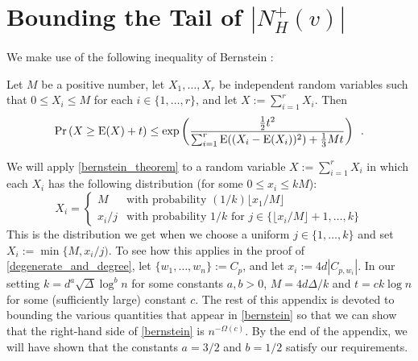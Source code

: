 \documentclass{patmorin}
\begin{document}



\appendix

\section{Bounding the Tail of \boldmath$|N_H^+(v)|$}

We make use of the following inequality of Bernstein \cite[Corollary~2.11]{boucheron.lugosi.ea:concentration}:

\begin{thm}\label{bernstein_theorem}
  Let $M$ be a positive number, let $X_1,\ldots,X_r$ be independent random variables such that $0\le X_i\le M$ for each $i\in\{1,\ldots,r\}$, and let $X:=\sum_{i=1}^r X_i$. Then
  \begin{equation}
    \Pr\left(X \ge \mathrm{E}(X)+ t\right)
      \le \exp\left(\frac{\tfrac{1}{2}t^2}{\sum_{i=1}^r \mathrm{E}((X_i-\mathrm{E}(X_i))^2)+\tfrac{1}{3}Mt}\right) \enspace . \label{bernstein}
  \end{equation}
\end{thm}
We will apply \cref{bernstein_theorem} to a random variable $X:=\sum_{i=1}^r X_i$ in which each $X_i$ has the following distribution (for some $0\le x_i\le kM$):
\[
  X_i = \begin{cases}
          M & \text{with probability $(1/k)\lfloor x_1/M\rfloor$} \\
          x_i/j & \text{with probability $1/k$ for $j\in\{\lfloor x_i/M\rfloor+1,\ldots,k\}$}
        \end{cases}
\]
This is the distribution we get when we choose a uniform $j\in\{1,\ldots,k\}$ and set $X_i:=\min\{M,x_i/j)$.  To see how this applies in the proof of \cref{degenerate_and_degree}, let $\{w_1,\ldots,w_n\}:=C_p$, and let $x_i:=4d|C_{p,w_i}|$.  In our setting $k=d^a\sqrt{\Delta}\log^b n$ for some constants $a,b>0$, $M=4d\Delta/k$ and $t=ck\log n$ for some (sufficiently large) constant $c$.  The rest of this appendix is devoted to bounding the various quantities that appear in \cref{bernstein} so that we can show that the right-hand side of \cref{bernstein} is $n^{-\Omega(c)}$.    By the end of the appendix, we will have shown that the constants $a=3/2$ and $b=1/2$ satisfy our requirements.
\end{document}
